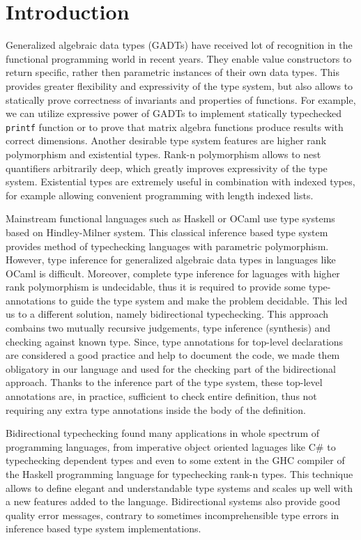 \documentclass[declaration,shortabstract,english]{iithesis}
\author         {Konrad Werbliński}
\begin{document}

\chapter{Introduction}
Generalized algebraic data types (GADTs)\cite{grd}\cite{fcpt} have received lot of recognition in
the functional programming world in recent years. They enable value constructors to return specific, rather
then parametric instances of their own data types. This provides greater flexibility and expressivity of the
type system, but also allows to statically prove correctness of invariants and properties of functions.
For example, we can utilize expressive power of GADTs to implement statically typechecked \verb+printf+ function
or to prove that matrix algebra functions produce results with correct dimensions. Another desirable type system
features are higher rank polymorphism and existential types. Rank-n polymorphism allows to nest quantifiers
arbitrarily deep, which greatly improves expressivity of the type system. Existential types are extremely useful
in combination with indexed types, for example allowing convenient programming with length indexed lists.

Mainstream functional languages such as Haskell or OCaml use type systems based on Hindley-Milner\cite{Hindley}\cite{Milner} system.
This classical inference based type system provides method of typechecking languages with parametric polymorphism.
However, type inference for generalized algebraic data types in languages like OCaml is difficult\cite{ocaml-gadts}.
Moreover, complete type inference for laguages with higher rank polymorphism is undecidable, thus it is required to
provide some type-annotations to guide the type system and make the problem decidable. This led us to a different solution,
namely bidirectional typechecking. This approach combains two mutually recursive judgements,
type inference (synthesis) and checking against known type.
Since, type annotations for top-level declarations are considered a good practice
and help to document the code, we made them obligatory in our language and used for the checking part of the bidirectional approach.
Thanks to the inference part of the type system, these top-level annotations are, in practice, sufficient to check entire
definition, thus not requiring any extra type annotations inside the body of the definition.

Bidirectional typechecking found many applications in whole spectrum of programming languages, from
imperative object oriented laguages like C\# \cite{csharp2}\cite{csharp3} to typechecking dependent types\cite{Coquand}
and even to some extent in the GHC compiler of the Haskell programming language for typechecking rank-n types\cite{peytonjones}.
This technique allows to define elegant and understandable type systems and scales up well with a new features added to the
language. Bidirectional systems also provide good quality error messages, contrary to sometimes incomprehensible type errors
in inference based type system implementations.
\end{document}
